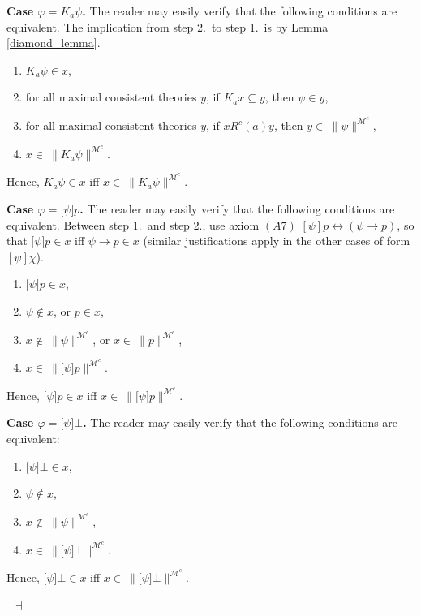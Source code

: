 \documentclass{article}[12pt]
\newenvironment{proof}{\noindent {\bf Proof \ }}{\hfill ~$\dashv$}
\renewcommand{\phi}{\varphi}
\begin{document}
\begin{proof}
\medskip \noindent 
{\bf Case $\phi=K_{a}\psi$.} The reader may easily verify that the following conditions are equivalent.
The implication from step 2.\ to step 1.\ is by Lemma \ref{diamond_lemma}.
\begin{enumerate}
\item $K_{a}\psi\in x$,
\item for all maximal consistent theories $y$, if $K_{a}x\subseteq y$, then $\psi\in y$,
\item for all maximal consistent theories $y$, if $xR^{c}(a)y$, then $y\in \ \parallel\psi\parallel^{\mathcal{M}^{c}}$,
\item $x\in \ \parallel K_{a}\psi\parallel^{\mathcal{M}^{c}}$.
\end{enumerate}
Hence, $K_{a}\psi\in x$ iff $x\in \ \parallel K_{a}\psi\parallel^{\mathcal{M}^{c}}$.


\medskip



\medskip \noindent 
{\bf Case $\phi=\lbrack\psi\rbrack p$.}
The reader may easily verify that the following conditions are equivalent. Between step 1.\ and step 2., use axiom $(A7)$ $[\psi]p \leftrightarrow (\psi \rightarrow p)$, so that  $\lbrack\psi\rbrack p\in x$ iff  $\psi \rightarrow p\in x$ (similar justifications apply in the other cases of form $[\psi]\chi$).
\begin{enumerate}
\item $\lbrack\psi\rbrack p\in x$,
\item $\psi\not\in x$, or $p\in x$,
\item $x\not\in \ \parallel\psi\parallel^{\mathcal{M}^{c}}$, or $x\in \ \parallel p\parallel^{\mathcal{M}^{c}}$,
\item $x\in \ \parallel\lbrack\psi\rbrack p\parallel^{\mathcal{M}^{c}}$.
\end{enumerate}
Hence, $\lbrack\psi\rbrack p\in x$ iff $x\in \ \parallel\lbrack\psi\rbrack p\parallel^{\mathcal{M}^{c}}$.


\medskip \noindent 
{\bf Case $\phi=\lbrack\psi\rbrack\bot$.}
The reader may easily verify that the following conditions are equivalent:
\begin{enumerate}
\item $\lbrack\psi\rbrack\bot\in x$,
\item $\psi\not\in x$,
\item $x\not\in \ \parallel\psi\parallel^{\mathcal{M}^{c}}$,
\item $x\in \ \parallel\lbrack\psi\rbrack\bot\parallel^{\mathcal{M}^{c}}$.
\end{enumerate}
Hence, $\lbrack\psi\rbrack\bot\in x$ iff $x\in \ \parallel\lbrack\psi\rbrack\bot\parallel^{\mathcal{M}^{c}}$.



\end{proof}
\end{document}
